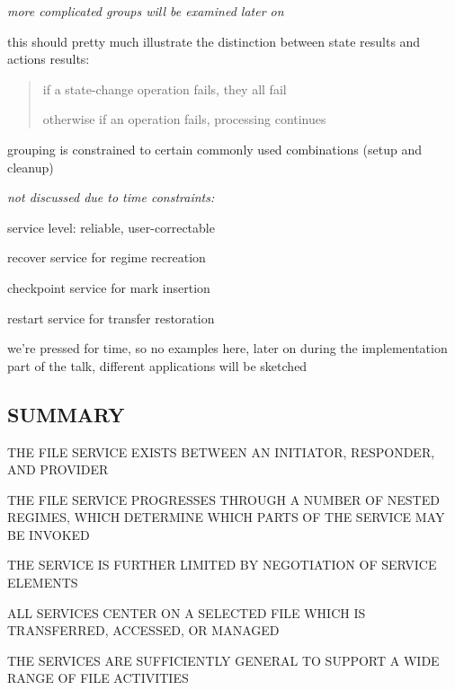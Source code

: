 \begin{note}\em
more complicated groups will be examined later on

this should pretty much illustrate the distinction between state results and
actions results:
\begin{quote}
if a state-change operation fails, they all fail

otherwise if an operation fails, processing continues
\end{quote}

grouping is constrained to certain commonly used combinations
(setup and cleanup)
\end{note}


\begin{note}\em
not discussed due to time constraints:

service level: reliable, user-correctable

recover service for regime recreation

checkpoint service for mark insertion

restart service for transfer restoration

we're pressed for time,
so no examples here, later on during the implementation part of the talk,
different applications will be sketched
\end{note}


\begin{bwslide}
\part*	{SUMMARY}\bf

\begin{nrtc}
\item	THE FILE SERVICE EXISTS BETWEEN AN INITIATOR, RESPONDER, AND PROVIDER

\item	THE FILE SERVICE PROGRESSES THROUGH A NUMBER OF NESTED REGIMES,
	WHICH DETERMINE WHICH PARTS OF THE SERVICE MAY BE INVOKED

\item	THE SERVICE IS FURTHER LIMITED BY NEGOTIATION OF SERVICE ELEMENTS

\item	ALL SERVICES CENTER ON A SELECTED FILE WHICH IS TRANSFERRED,
	ACCESSED, OR MANAGED

\item	THE SERVICES ARE SUFFICIENTLY GENERAL TO SUPPORT A WIDE RANGE OF
	FILE ACTIVITIES
\end{nrtc}
\end{bwslide}
